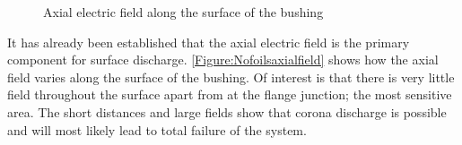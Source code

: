 \begin{figure}[!h]
  \centering
{} 
\caption{Axial electric field along the surface of the bushing}
\label{Figure:Nofoilsaxialfieldwhole}
\end{figure}

It has already been established that the axial electric field is the primary component for surface discharge. \ref{Figure:Nofoilsaxialfield} shows how the axial field varies along the surface of the bushing. Of interest is that there is very little field throughout the surface apart from at the flange junction; the most sensitive area. The short distances and large fields show that corona discharge is possible and will most likely lead to total failure of the system. 

